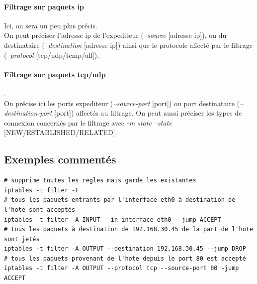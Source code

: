 \documentclass{article}
\begin{document}
\paragraph{Filtrage sur paquets ip}
Ici, on sera un peu plus précis.\\
On peut préciser l'adresse ip de l'expediteur (\emph{--source} [adresse ip]), ou du destinataire (\emph{--destination} [adresse ip]) ainsi que le protocole affecté par le filtrage (\emph{--protocol} [tcp/udp/tcmp/all]).

\paragraph{Filtrage sur paquets tcp/udp}.\\
On précise ici les ports expediteur (\emph{--source-port} [port]) ou port destinataire (\emph{--destination-port} [port]) affectés au filtrage. On peut aussi préciser les types de connexion concernés par le filtrage avec \emph{-m state --state} [NEW/ESTABLISHED/RELATED].

\subsection{Exemples commentés}
\begin{verbatim}
# supprime toutes les regles mais garde les existantes
iptables -t filter -F
# tous les paquets entrants par l'interface eth0 à destination de l'hote sont acceptés
iptables -t filter -A INPUT --in-interface eth0 --jump ACCEPT
# tous les paquets à destination de 192.168.30.45 de la part de l'hote sont jetés
iptables -t filter -A OUTPUT --destination 192.168.30.45 --jump DROP
# tous les paquets provenant de l'hote depuis le port 80 est accepté
iptables -t filter -A OUTPUT --protocol tcp --source-port 80 -jump ACCEPT
\end{verbatim}
\end{document}
